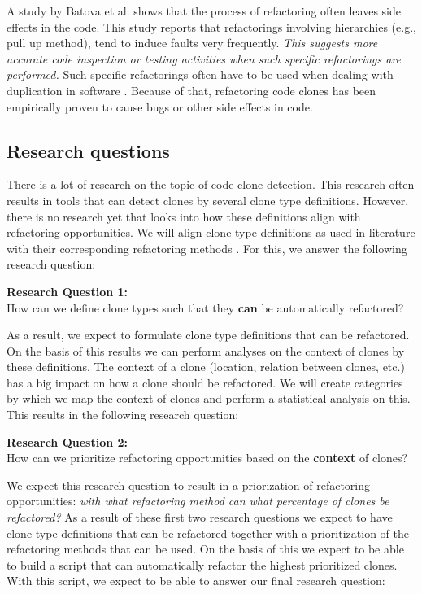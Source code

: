 A study by Batova et al. \cite{bavota2012does} shows that the process of refactoring often leaves side effects in the code. This study reports that refactorings involving hierarchies (e.g., pull up method), tend to induce faults very frequently. \textit{This suggests more accurate code inspection or testing activities when such specific refactorings are performed.} Such specific refactorings often have to be used when dealing with duplication in software \cite{fowler2018refactoring, fontana2015duplicated}. Because of that, refactoring code clones has been empirically proven to cause bugs or other side effects in code.

\subsection{Research questions}
There is a lot of research on the topic of code clone detection. This research often results in tools that can detect clones by several clone type definitions. However, there is no research yet that looks into how these definitions align with refactoring opportunities. We will align clone type definitions as used in literature \cite{roy2007survey} with their corresponding refactoring methods \cite{fowler2018refactoring}. For this, we answer the following research question:
\begin{displayquote}
\textbf{Research Question 1:}\\How can we define clone types such that they \textbf{can} be automatically refactored?
\end{displayquote}
As a result, we expect to formulate clone type definitions that can be refactored. On the basis of this results we can perform analyses on the context of clones by these definitions. The context of a clone (location, relation between clones, etc.) has a big impact on how a clone should be refactored. We will create categories by which we map the context of clones and perform a statistical analysis on this. This results in the following research question:
\begin{displayquote}
\textbf{Research Question 2:}\\How can we prioritize refactoring opportunities based on the \textbf{context} of clones?
\end{displayquote}
We expect this research question to result in a priorization of refactoring opportunities: \textit{with what refactoring method can what percentage of clones be refactored?} As a result of these first two research questions we expect to have clone type definitions that can be refactored together with a prioritization of the refactoring methods that can be used. On the basis of this we expect to be able to build a script that can automatically refactor the highest prioritized clones. With this script, we expect to be able to answer our final research question:
